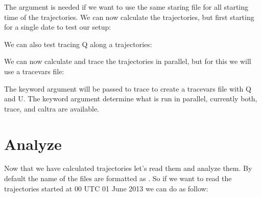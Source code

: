 \documentclass[a4paper,10pt,english]{sphinxmanual}
\begin{document}
The  argument is needed if we want to use the same staring file for all starting time of the trajectories.
We can now calculate the trajectories, but first starting for a single date to test our setup:

\begin{sphinxVerbatim}[commandchars=\\\{\}]
  \PYG{p}{[}\PYG{p}{]}
\end{sphinxVerbatim}

We can also test tracing Q along a trajectories:

\begin{sphinxVerbatim}[commandchars=\\\{\}]
  \PYG{p}{[}\PYG{p}{]}\PYG{p}{[}\PYG{p}{]} 
\end{sphinxVerbatim}

We can now calculate and trace the trajectories in parallel, but for this we will use a tracevars file:

\begin{sphinxVerbatim}[commandchars=\\\{\}]
  
    
\end{sphinxVerbatim}

The  keyword argument will be passed to trace to create a tracevars file with Q and U.
The  keyword argument determine what is run in parallel, currently both, trace, and caltra are available.


\section{Analyze}
\label{\detokenize{tutorial_lagranto:analyze}}
Now that we have calculated trajectories let’s read them and analyze them. By default the name of the files are formatted as .
So if we want to read the trajectories started at 00 UTC 01 June 2013 we can do as follow:
\end{document}
